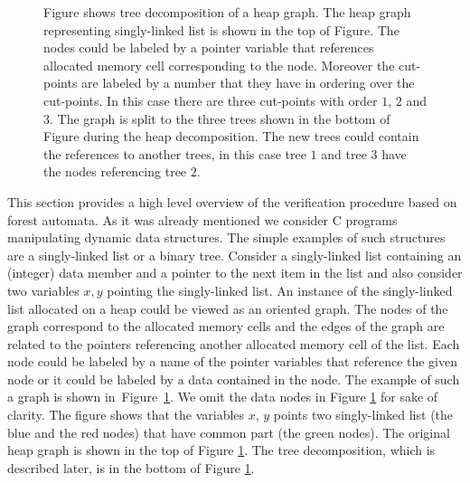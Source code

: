 \documentclass[fleqn,11pt]{ExcelAtFIT} %
\begin{document}
\begin{figure}[t]
	\centering
	
	
	\vspace{0.5cm}
	
	
	\caption{
	Figure shows tree decomposition of a heap graph.
    The heap graph representing singly-linked list is shown in the top of Figure.
	The nodes could be labeled by a pointer variable that references allocated memory cell
	corresponding to the node.
	Moreover the cut-points are labeled by a number that they have in ordering over
	the cut-points.
	In this case there are three cut-points with order $1$, $2$ and $3$.
	The graph is split to the three trees shown in the bottom of Figure during the heap decomposition.
	The new trees could contain the references to another trees, in this case tree $1$ and tree $3$
	have the nodes referencing tree $2$.}
	\label{fig:graph}
\end{figure}

This section provides a high level overview of the verification procedure based
on forest automata.
As it was already mentioned we consider C programs manipulating dynamic data structures.
The simple examples of such structures are a singly-linked list or a binary tree.
Consider a singly-linked list containing an (integer) data member and a pointer
to the next item in the list and also
consider two variables $x,y$ pointing the singly-linked list.
An instance of the singly-linked list allocated on a heap could be viewed as an oriented graph.
The nodes of the graph correspond to the allocated memory cells
and the edges of the graph are related to the pointers referencing
another allocated memory cell of the list.
Each node could be labeled by a name of the pointer variables that
reference the given node or it could be labeled by a data contained in the node.
The example of such a graph is shown in~Figure~\ref{fig:graph}.
We omit the data nodes in Figure \ref{fig:graph} for sake of clarity.
The figure shows that the variables $x$, $y$ points two singly-linked list (the blue and the red nodes) that
have common part (the green nodes).
The original heap graph is shown in the top of Figure \ref{fig:graph}.
The tree decomposition, which is described later, is in the bottom of Figure \ref{fig:graph}.
\end{document}
